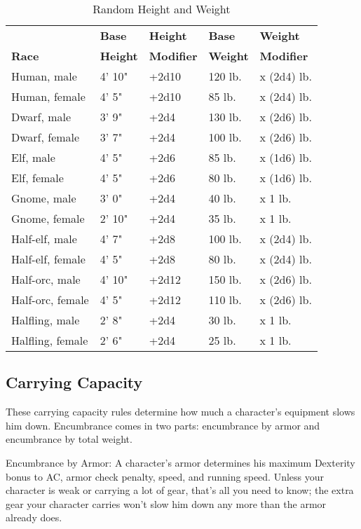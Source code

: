 \begin{table}[htb]
\sffamily
{}
\caption{Random Height and Weight}
\begin{tabular}{lllll}
              & \textbf{Base}   & \textbf{Height}   & \textbf{Base}   & \textbf{Weight}\\
\textbf{Race} & \textbf{Height} & \textbf{Modifier} & \textbf{Weight} & \textbf{Modifier}\\
Human, male & 4' 10" & +2d10 & 120 lb. & x (2d4) lb.\\
Human, female & 4' 5" & +2d10 & 85 lb. & x (2d4) lb.\\
Dwarf, male & 3' 9" & +2d4 & 130 lb. & x (2d6) lb.\\
Dwarf, female & 3' 7" & +2d4 & 100 lb. & x (2d6) lb.\\
Elf, male & 4' 5" & +2d6 & 85 lb. & x (1d6) lb.\\
Elf, female & 4' 5" & +2d6 & 80 lb. & x (1d6) lb.\\
Gnome, male & 3' 0" & +2d4 & 40 lb. & x 1 lb.\\
Gnome, female & 2' 10" & +2d4 & 35 lb. & x 1 lb.\\
Half-elf, male & 4' 7" & +2d8 & 100 lb. & x (2d4) lb.\\
Half-elf, female & 4' 5" & +2d8 & 80 lb. & x (2d4) lb.\\
Half-orc, male & 4' 10" & +2d12 & 150 lb. & x (2d6) lb.\\
Half-orc, female & 4' 5" & +2d12 & 110 lb. & x (2d6) lb.\\
Halfling, male & 2' 8" & +2d4 & 30 lb. & x 1 lb.\\
Halfling, female & 2' 6" & +2d4 & 25 lb. & x 1 lb.\\
\end{tabular}
\end{table}

\subsection{Carrying Capacity}

				
These carrying capacity rules determine how much a character's equipment slows him down. Encumbrance comes in two parts: encumbrance by armor and encumbrance by total weight.
				
Encumbrance by Armor: A character's armor determines his maximum Dexterity bonus to AC, armor check penalty, speed, and running speed. Unless your character is weak or carrying a lot of gear, that's all you need to know; the extra gear your character carries won't slow him down any more than the armor already does.
				
